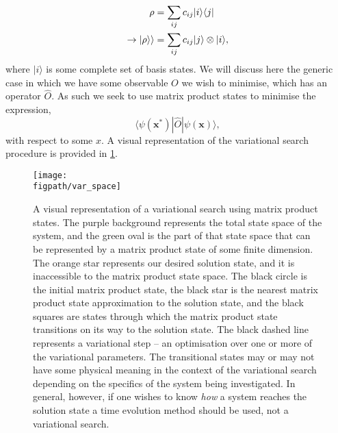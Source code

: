 \begin{align}
\rho &= \sum_{ij} c_{ij} |i \rangle \langle j| \notag \\
\rightarrow | \rho \rangle \rangle &= \sum_{ij} c_{ij} |j \rangle \otimes |i \rangle,
\label{eq:vs1-11}
\end{align}
where \(|i\rangle\) is some complete set of basis states. We will discuss here the generic case in which we have some observable \(O\) we wish to minimise, which has an operator \(\hat{O}\). As such we seek to use matrix product states to minimise the expression,
\begin{equation}
\langle \psi(\mathbf{x}^{*}) | \hat{O} | \psi(\mathbf{x}) \rangle,
\label{eq:vs1-10}
\end{equation}
with respect to some \(x\). A visual representation of the variational search procedure is provided in \cref{fig:vs1-1}.

\begin{figure}[ht!]
\centering
\texttt{[image: \\figpath/var\_space]}
\caption{A visual representation of a variational search using matrix product states. The purple background represents the total state space of the system, and the green oval is the part of that state space that can be represented by a matrix product state of some finite dimension. The orange star represents our desired solution state, and it is inaccessible to the matrix product state space. The black circle is the initial matrix product state, the black star is the nearest matrix product state approximation to the solution state, and the black squares are states through which the matrix product state transitions on its way to the solution state. The black dashed line represents a variational step -- an optimisation over one or more of the variational parameters. The transitional states may or may not have some physical meaning in the context of the variational search depending on the specifics of the system being investigated. In general, however, if one wishes to know \emph{how} a system reaches the solution state a time evolution method should be used, not a variational search.}
\label{fig:vs1-1}
\end{figure}

